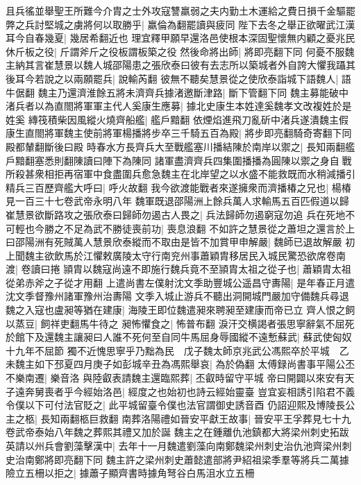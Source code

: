 且兵徭並舉聖王所難今介胄之士外攻寇讐羸弱之夫内勤土木運給之費日損千金驅罷弊之兵討堅城之虜將何以取勝乎|{
	羸倫為翻罷讀與疲同}
陛下去冬之舉正欲曜武江漢耳今自春幾夏|{
	幾居希翻近也}
理宜釋甲願早還洛邑使根本深固聖懷無内顧之憂兆民休斤板之役|{
	斤謂斧斤之役板謂板築之役}
然後命將出師|{
	將即亮翻下同}
何憂不服魏主納其言崔慧景以魏人城邵陽患之張欣泰曰彼有去志所以築城者外自誇大懼我躡其後耳今若說之以兩願罷兵|{
	說輸芮翻}
彼無不聽矣慧景從之使欣泰詣城下語魏人|{
	語牛倨翻}
魏主乃還濟淮餘五將未濟齊兵據渚邀斷津路|{
	斷下管翻下同}
魏主募能破中渚兵者以為直閤將軍軍主代人奚康生應募|{
	據北史康生本姓達奚魏孝文改複姓於是姓奚}
縳筏積柴因風縱火燒齊船艦|{
	艦戶黯翻}
依煙焰進飛刀亂斫中渚兵遂潰魏主假康生直閤將軍魏主使前將軍楊播將步卒三千騎五百為殿|{
	將步即亮翻騎奇寄翻下同殿都輦翻斷後曰殿}
時春水方長齊兵大至戰艦塞川播結陳於南岸以禦之|{
	長知兩翻艦戶黯翻塞悉則翻陳讀曰陣下為陳同}
諸軍盡濟齊兵四集圍播播為圓陳以禦之身自戰所殺甚衆相拒再宿軍中食盡圍兵愈急魏主在北岸望之以水盛不能救既而水稍減播引精兵三百歷齊艦大呼曰|{
	呼火故翻}
我今欲渡能戰者來遂擁衆而濟播椿之兄也|{
	楊椿見一百三十七卷武帝永明八年}
魏軍既退邵陽洲上餘兵萬人求輸馬五百匹假道以歸崔慧景欲斷路攻之張欣泰曰歸師勿遏古人畏之|{
	兵法歸師勿遏窮寇勿追}
兵在死地不可輕也今勝之不足為武不勝徒喪前功|{
	喪息浪翻}
不如許之慧景從之蕭坦之還言於上曰邵陽洲有死賊萬人慧景欣泰縱而不取由是皆不加賞甲申解嚴|{
	魏師已退故解嚴}
初上聞魏主欲飲馬於江懼敕廣陵太守行南兖州事蕭穎胄移居民入城民驚恐欲席卷南渡|{
	卷讀曰捲}
頴胄以魏寇尚遠不即施行魏兵竟不至頴胄太祖之從子也|{
	蕭穎胄太祖從弟赤斧之子從才用翻}
上遣尚書左僕射沈文季助豐城公遥昌守夀陽|{
	是年春正月遣沈文季督豫州諸軍豫州治夀陽}
文季入城止游兵不聽出洞開城門嚴加守備魏兵尋退魏之入寇也盧昶等猶在建康|{
	海陵王即位魏遣昶來聘昶至建康而帝已立}
齊人恨之飼以蒸豆|{
	飼祥吏翻馬牛待之}
昶怖懼食之|{
	怖普布翻}
淚汗交横謁者張思寧辭氣不屈死於館下及還魏主讓昶曰人誰不死何至自同牛馬屈身辱國縱不遠慙蘇武|{
	蘇武使匈奴十九年不屈節}
獨不近愧思寧乎乃黜為民　戊子魏太師京兆武公馮熙卒於平城　乙未魏主如下邳夏四月庚子如彭城辛丑為馮熙舉哀|{
	為於偽翻}
太傅録尚書事平陽公丕不樂南遷|{
	樂音洛}
與陸叡表請魏主還臨熙葬|{
	丕叡時留守平城}
帝曰開闢以來安有天子遠奔舅喪者乎今經始洛邑|{
	經度之也始初也詩云經始靈臺}
豈宜妄相誘引陷君不義令僕以下可付法官貶之|{
	此平城留臺令僕也法官謂御史誘音酉}
仍詔迎熙及博陵長公主之柩|{
	長知兩翻柩巨救翻}
南葬洛陽禮如晉安平獻王故事|{
	晉安平王孚葬見七十九卷武帝泰始八年魏之葬熙其禮又加於誕}
魏主之在鍾離仇池鎮都大將梁州刺史拓跋英請以州兵會劉藻擊漢中|{
	去年十一月魏遣劉藻向南鄭魏梁州刺史治仇池齊梁州刺史治南鄭將即亮翻下同}
魏主許之梁州刺史蕭懿遣部將尹紹祖梁季羣等將兵二萬據險立五柵以拒之|{
	據蕭子顯齊書時據角弩谷白馬沮水立五柵}
